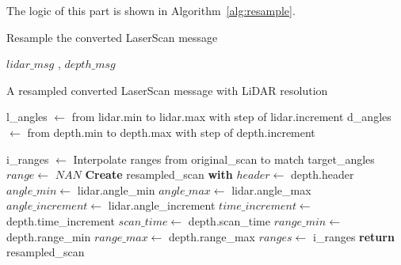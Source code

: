The logic of this part is shown in Algorithm~\ref{alg:resample}.
\begin{algorithm}[H]
    \caption{Resample the converted LaserScan message}\label{alg:resample}
    \begin{algorithmic}
        \Require $lidar\_msg$ , $depth\_msg$ 
    
        \Ensure A resampled converted LaserScan message with LiDAR resolution

        \State l\_angles $\gets$ from lidar.min to lidar.max with step of lidar.increment
        \State d\_angles $\gets$ from depth.min to depth.max with step of depth.increment

        \State i\_ranges $\gets$ Interpolate ranges from original\_scan to match target\_angles
            \State $range \gets$ $NAN$
        \EndIf
        \State \textbf{Create} resampled\_scan \textbf{with}
            \State $header \gets$ depth.header
            \State $angle\_min \gets$ lidar.angle\_min
            \State $angle\_max \gets$ lidar.angle\_max
            \State $angle\_increment \gets$ lidar.angle\_increment
            \State $time\_increment \gets$ depth.time\_increment
            \State $scan\_time \gets$ depth.scan\_time
            \State $range\_min \gets$ depth.range\_min
            \State $range\_max \gets$ depth.range\_max
            \State $ranges \gets$ i\_ranges
        \State \textbf{return} resampled\_scan
    \end{algorithmic}
\end{algorithm}